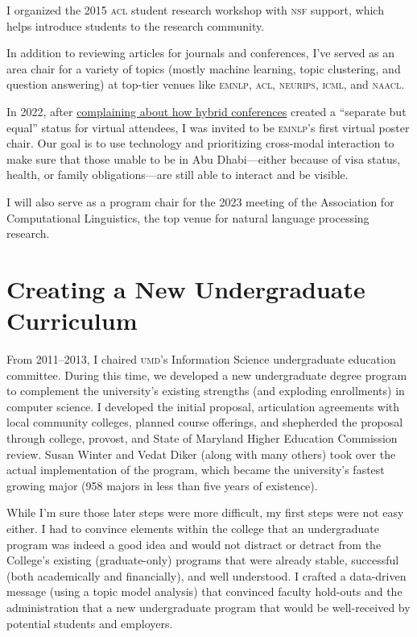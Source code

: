 \documentclass[11pt]{amsart}
\newcommand{\abr}[1]{\textsc{#1}}
\begin{document}
I organized the 2015 \abr{acl} student research workshop with
\abr{nsf} support, which helps introduce students to the research
community.

In addition to reviewing articles for journals and conferences, I've
served as an area chair for a variety of topics (mostly machine
learning, topic clustering, and question answering) at top-tier venues
like \abr{emnlp}, \abr{acl}, \abr{neurips}, \abr{icml}, and
\abr{naacl}.  

In 2022, after
\href{https://www.youtube.com/watch?v=3gSgNXGxzQU}{complaining about
  how hybrid conferences} created a ``separate but equal'' status for
virtual attendees, I was invited to be \abr{emnlp}'s first virtual
poster chair.
%
Our goal is to use technology and prioritizing cross-modal interaction
to make sure that those unable to be in Abu Dhabi---either because of
visa status, health, or family obligations---are still able to
interact and be visible.

I will also serve as a program chair for the 2023 meeting of the
Association for Computational Linguistics, the top venue for natural
language processing research.



\section{Creating a New Undergraduate Curriculum}

From 2011--2013, I chaired \abr{umd}'s Information Science
undergraduate education committee. During this time, we developed a
new undergraduate degree program to complement the university's
existing strengths (and exploding enrollments) in computer science. I
developed the initial proposal, articulation agreements with local
community colleges, planned course offerings, and shepherded the
proposal through college, provost, and State of Maryland Higher
Education Commission review.
%
Susan Winter and Vedat Diker (along with many others) took over the actual
implementation of the program, which became the university's fastest growing
major (958 majors in less than five years of existence).

While I'm sure those later steps were more difficult, my first steps
were not easy either.
%
I had to convince elements within the college that an
undergraduate program was indeed a good idea and would not distract or
detract from the College's existing (graduate-only) programs that were
already stable, successful (both academically and financially), and
well understood.
%
I crafted a data-driven message (using a topic model analysis) that
convinced faculty hold-outs and the administration that a new
undergraduate program that would be well-received by potential
students and employers.
\end{document}
